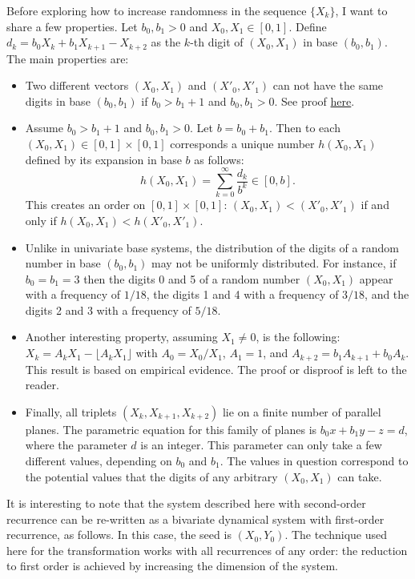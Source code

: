 \documentclass[oneside,10pt]{book}
\begin{document}
Before exploring how to increase randomness in the sequence $\{X_k\}$, I want to share a few properties. Let $b_0,b_1 >0$
and $X_0, X_1\in [0,1]$. Define $d_k = b_0 X_k + b_1 X_{k+1}-X_{k+2}$ as the $k$-th digit of $(X_0,X_1)$ in base $(b_0, b_1)$.
The main properties are:\vspace{1ex}
\begin{itemize}
\item Two different vectors
 $(X_0, X_1)$ and $(X'_0,X'_1)$ can not have the same digits in base $(b_0,b_1)$ if $b_0>b_1 + 1$ and $b_0,b_1>0$. See
proof \href{https://mathoverflow.net/questions/372712/hybrid-numeration-system-on-0-12}{here}.

\item Assume $b_0>b_1 + 1$ and $b_0,b_1>0$. Let $b=b_0+b_1$. Then to each $(X_0, X_1)\in [0,1]\times [0,1]$ corresponds a unique number
$h(X_0,X_1)$ defined by its expansion in base $b$ as follows:
$$
h(X_0, X_1)=\sum_{k=0}^\infty \frac{d_k}{b^k} \in [0, b].
$$
This creates an order on $[0, 1]\times [0, 1]$: $(X_0, X_1) < (X'_0,X'_1)$ if and only if
$h(X_0, X_1) < h(X'_0,X'_1)$.
\item Unlike in univariate base systems, the distribution of the digits of a random number in base $(b_0,b_1)$ may not be uniformly distributed.
For instance, if $b_0=b_1=3$ then the digits 0 and 5 of a random number $(X_0,X_1)$
appear with a frequency of $1/18$, the digits 1 and 4 with a frequency of $3/18$,
 and the digits 2 and 3 with a frequency of $5/18$.

\item Another interesting property, assuming $X_1\neq 0$, is the following: $X_k = A_k X_1 - \lfloor A_k X_1\rfloor$ with $A_0=X_0/X_1$, $A_1=1$, and
$A_{k+2} = b_1 A_{k+1} + b_0 A_k$. This result is based on empirical evidence. The proof or disproof is left to the reader.

\item Finally, all triplets $(X_k, X_{k+1},X_{k+2})$ lie on a finite number of parallel planes. The parametric equation for  this family of planes is
$b_0 x + b_1 y-z = d$, where the parameter $d$ is an integer. This parameter can only take a few different values, depending on $b_0$ and $b_1$. The values in question correspond to the potential values that the digits of any arbitrary $(X_0,X_1)$ can take.
 \end{itemize}\vspace{1ex}

\noindent It is interesting to note that the system described here with second-order recurrence can be re-written as a
\textcolor{index}{bivariate dynamical system} with first-order recurrence, as follows. In this case, the seed is $(X_0,Y_0)$. The technique used here for the transformation works with all recurrences of any order: the reduction to first order is achieved by increasing the dimension of the system.
\end{document}
